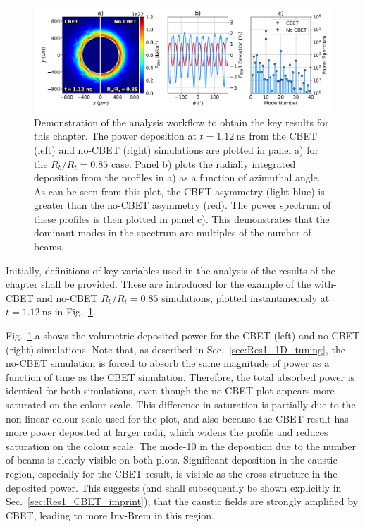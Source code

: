 \begin{figure}[t!]
    \includegraphics[width=\linewidth]{Results1/Images/Mode_analysis.png}
    \centering
    \caption{Demonstration of the analysis workflow to obtain the key results for this chapter.
    The power deposition at $t=1.12\ \text{ns}$ from the \ac{CBET} (left) and no-\ac{CBET} (right) simulations are plotted in panel a) for the $R_b/R_t=0.85$ case.
    Panel b) plots the radially integrated deposition from the profiles in a) as a function of azimuthal angle.
    As can be seen from this plot, the \ac{CBET} asymmetry (light-blue) is greater than the no-\ac{CBET} asymmetry (red).
    The power spectrum of these profiles is then plotted in panel c).
    This demonstrates that the dominant modes in the spectrum are multiples of the number of beams.}%
    \label{fig:Res1_analysis}
\end{figure}

Initially, definitions of key variables used in the analysis of the results of the chapter shall be provided.
These are introduced for the example of the with-\ac{CBET} and no-\ac{CBET} $R_b/R_t=0.85$ simulations, plotted instantaneously at $t=1.12\ \text{ns}$ in Fig.~\ref{fig:Res1_analysis}.

Fig.~\ref{fig:Res1_analysis}.a shows the volumetric deposited power for the \ac{CBET} (left) and no-\ac{CBET} (right) simulations.
Note that, as described in Sec.~\ref{sec:Res1_1D_tuning}, the no-\ac{CBET} simulation is forced to absorb the same magnitude of power as a function of time as the \ac{CBET} simulation.
Therefore, the total absorbed power is identical for both simulations, even though the no-\ac{CBET} plot appears more saturated on the colour scale.
This difference in saturation is partially due to the non-linear colour scale used for the plot, and also because the \ac{CBET} result has more power deposited at larger radii, which widens the profile and reduces saturation on the colour scale.
The mode-10 in the deposition due to the number of beams is clearly visible on both plots.
Significant deposition in the caustic region, especially for the \ac{CBET} result, is visible as the cross-structure in the deposited power.
This suggests (and shall subsequently be shown explicitly in Sec.~\ref{sec:Res1_CBET_imprint}), that the caustic fields are strongly amplified by \ac{CBET}, leading to more \ac{Inv-Brem} in this region.


